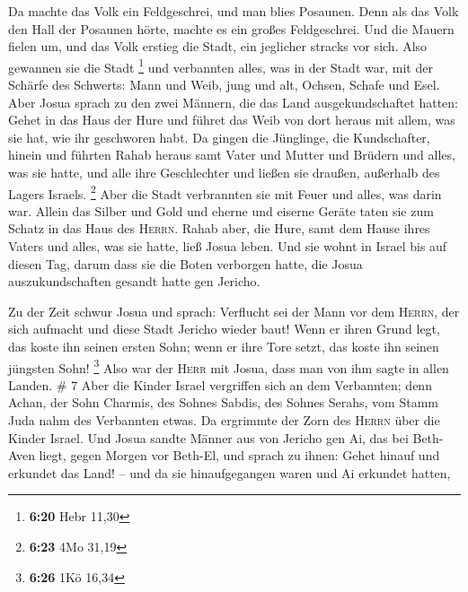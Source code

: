  Da machte das Volk ein Feldgeschrei, und man blies
Posaunen. Denn als das Volk den Hall der Posaunen hörte, machte es ein
großes Feldgeschrei. Und die Mauern fielen um, und das Volk erstieg die
Stadt, ein jeglicher stracks vor sich. Also gewannen sie die Stadt
\footnote{\textbf{6:20} Hebr 11,30}  und verbannten
alles, was in der Stadt war, mit der Schärfe des Schwerts: Mann und
Weib, jung und alt, Ochsen, Schafe und Esel.  Aber Josua
sprach zu den zwei Männern, die das Land ausgekundschaftet hatten: Gehet
in das Haus der Hure und führet das Weib von dort heraus mit allem, was
sie hat, wie ihr geschworen habt.  Da gingen die
Jünglinge, die Kundschafter, hinein und führten Rahab heraus samt Vater
und Mutter und Brüdern und alles, was sie hatte, und alle ihre
Geschlechter und ließen sie draußen, außerhalb des Lagers Israels.
\footnote{\textbf{6:23} 4Mo 31,19}  Aber die Stadt
verbrannten sie mit Feuer und alles, was darin war. Allein das Silber
und Gold und eherne und eiserne Geräte taten sie zum Schatz in das Haus
des \textsc{Herrn}.  Rahab aber, die Hure, samt dem Hause
ihres Vaters und alles, was sie hatte, ließ Josua leben. Und sie wohnt
in Israel bis auf diesen Tag, darum dass sie die Boten verborgen hatte,
die Josua auszukundschaften gesandt hatte gen Jericho.

 Zu der Zeit schwur Josua und sprach: Verflucht sei der
Mann vor dem \textsc{Herrn}, der sich aufmacht und diese Stadt Jericho
wieder baut! Wenn er ihren Grund legt, das koste ihn seinen ersten Sohn;
wenn er ihre Tore setzt, das koste ihn seinen jüngsten Sohn! \footnote{\textbf{6:26}
  1Kö 16,34}  Also war der \textsc{Herr} mit Josua, dass
man von ihm sagte in allen Landen. \# 7  Aber die Kinder
Israel vergriffen sich an dem Verbannten; denn Achan, der Sohn Charmis,
des Sohnes Sabdis, des Sohnes Serahs, vom Stamm Juda nahm des Verbannten
etwas. Da ergrimmte der Zorn des \textsc{Herrn} über die Kinder Israel.
 Und Josua sandte Männer aus von Jericho gen Ai, das bei
Beth-Aven liegt, gegen Morgen vor Beth-El, und sprach zu ihnen: Gehet
hinauf und erkundet das Land! -- und da sie hinaufgegangen waren und Ai
erkundet hatten,

